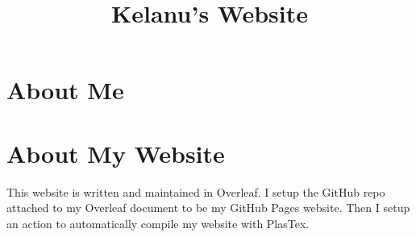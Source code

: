 \documentclass{article}
\title{Kelanu's Website}
\begin{document}
\maketitle
\section{About Me}

\section{About My Website}
This website is written and maintained in Overleaf. I setup the GitHub repo attached to my Overleaf document to be my GitHub Pages website. Then I setup an action to automatically compile my website with PlasTex.
\end{document}
